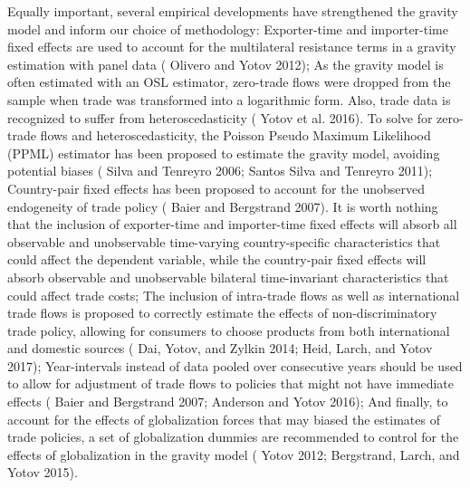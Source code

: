 Equally important, several empirical developments have strengthened the
gravity model and inform our choice of methodology: Exporter-time and
importer-time fixed effects are used to account for the multilateral
resistance terms in a gravity estimation with panel data (\cite{olivero_dynamic_2012} Olivero and
Yotov 2012); As the gravity model is often estimated with an OSL
estimator, zero-trade flows were dropped from the sample when trade was
transformed into a logarithmic form. Also, trade data is recognized to
suffer from heteroscedasticity (\cite{yotov_advanced_2016} Yotov et al. 2016). To solve for
zero-trade flows and heteroscedasticity, the Poisson Pseudo Maximum
Likelihood (PPML) estimator has been proposed to estimate the gravity
model, avoiding potential biases (\cite{silva_log_2006} Silva and Tenreyro 2006; \cite{santos_silva_further_2011} Santos Silva
and Tenreyro 2011); Country-pair fixed effects has been proposed to
account for the unobserved endogeneity of trade policy (\cite{baier_free_2007-1} Baier and
Bergstrand 2007). It is worth nothing that the inclusion of
exporter-time and importer-time fixed effects will absorb all observable
and unobservable time-varying country-specific characteristics that
could affect the dependent variable, while the country-pair fixed
effects will absorb observable and unobservable bilateral time-invariant
characteristics that could affect trade costs; The inclusion of
intra-trade flows as well as international trade flows is proposed to
correctly estimate the effects of non-discriminatory trade policy,
allowing for consumers to choose products from both international and
domestic sources (\cite{dai_trade-diversion_2014} Dai, Yotov, and Zylkin 2014; \cite{heid_estimating_2017} Heid, Larch, and Yotov
2017); Year-intervals instead of data pooled over consecutive years
should be used to allow for adjustment of trade flows to policies that
might not have immediate effects (\cite{baier_free_2007-2} Baier and Bergstrand 2007; \cite{anderson_terms_2016-1} Anderson
and Yotov 2016); And finally, to account for the effects of
globalization forces that may biased the estimates of trade policies, a
set of globalization dummies are recommended to control for the effects
of globalization in the gravity model (\cite{yotov_simple_2012} Yotov 2012; \cite{bergstrand_economic_2015} Bergstrand, Larch,
and Yotov 2015).